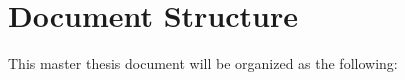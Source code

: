


\section{Document Structure} 
\label{sub:if_you_use_this_template}

This master thesis document will be organized as the following: 

